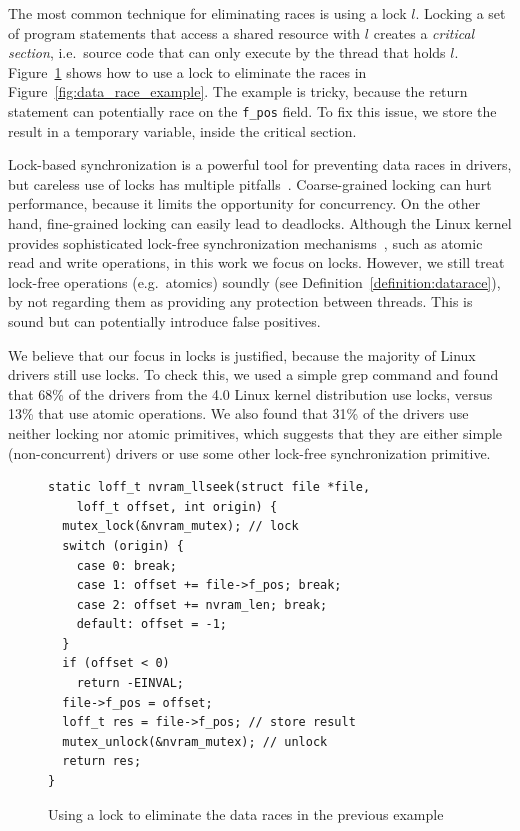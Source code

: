 The most common technique for eliminating races is using a lock $l$. Locking a set of program statements that access a shared resource with $l$ creates a \emph{critical section}, i.e.\ source code that can only execute by the thread that holds $l$. Figure~\ref{fig:lock_example} shows how to use a lock to eliminate the races in Figure~\ref{fig:data_race_example}. The example is tricky, because the return statement can potentially race on the \texttt{f\_pos} field. To fix this issue, we store the result in a temporary variable, inside the critical section.

Lock-based synchronization is a powerful tool for preventing data races in drivers, but careless use of locks has multiple pitfalls~\cite{sutter2005software}. Coarse-grained locking can hurt performance, because it limits the opportunity for concurrency. On the other hand, fine-grained locking can easily lead to deadlocks. Although the Linux kernel provides sophisticated lock-free synchronization mechanisms~\cite{corbet2005linux}, such as atomic read and write operations, in this work we focus on locks. However, we still treat lock-free operations (e.g.\ atomics) soundly (see Definition~\ref{definition:datarace}), by not regarding them as providing any protection between threads. This is sound but can potentially introduce false positives.

We believe that our focus in locks is justified, because the majority of Linux drivers still use locks. To check this, we used a simple grep command and found that 68\% of the drivers from the 4.0 Linux kernel distribution use locks, versus 13\% that use atomic operations. We also found that 31\% of the drivers use neither locking nor atomic primitives, which suggests that they are either simple (non-concurrent) drivers or use some other lock-free synchronization primitive.

\begin{figure}[t]
\begin{lstlisting}
static loff_t nvram_llseek(struct file *file,
    loff_t offset, int origin) {
  mutex_lock(&nvram_mutex); // lock
  switch (origin) {
    case 0: break;
    case 1: offset += file->f_pos; break;
    case 2: offset += nvram_len; break;
    default: offset = -1;
  }
  if (offset < 0)
    return -EINVAL;
  file->f_pos = offset;
  loff_t res = file->f_pos; // store result
  mutex_unlock(&nvram_mutex); // unlock
  return res;
}
\end{lstlisting}
\caption{Using a lock to eliminate the data races in the previous example}
\label{fig:lock_example}
\end{figure}

